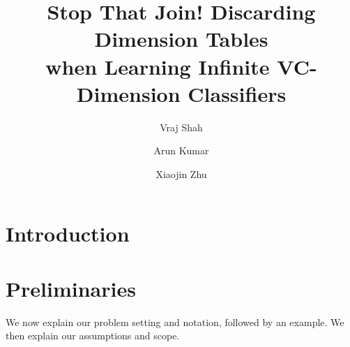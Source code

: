 \documentclass[sigconf]{acmart}
\begin{document}
\title{Stop That Join! Discarding Dimension Tables \\when Learning Infinite VC-Dimension Classifiers}

\author{Vraj Shah}
\author{Arun Kumar}
\author{Xiaojin Zhu}

\begin{abstract}

\end{abstract}


\maketitle

\section{Introduction}



\section{Preliminaries}
We now explain our problem setting and notation, followed by an example. We then explain our assumptions and scope.
\end{document}
